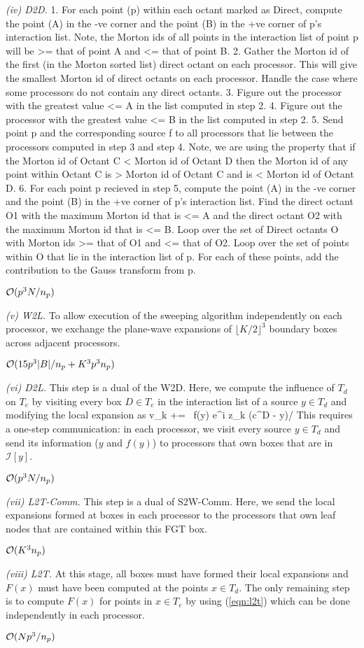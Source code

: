 {\em (iv) D2D.}
1. For each point (p) within each octant marked as Direct, compute the
point (A) in the -ve corner and the point (B) in the +ve corner of p's
interaction list. Note, the Morton ids of all points in the interaction
list of point p will be >= that of point A and <= that of point B.
2. Gather the Morton id of the first (in the Morton sorted list) direct
octant on each processor. This will give the smallest Morton id of
direct octants on each processor. Handle the case where some processors
do not contain any direct octants.
3. Figure out the processor with the greatest value <= A in the list
computed in step 2.
4. Figure out the processor with the greatest value <= B in the list
computed in step 2.
5. Send point p and the corresponding source f to all processors that
lie between the processors computed in step 3 and step 4. Note, we are 
using the property that if the Morton id of Octant C < Morton id of 
Octant D then the Morton id of any point within Octant C is >  Morton
id of Octant C and is < Morton id of Octant D.
6. For each point p recieved in step 5, compute the
point (A) in the -ve corner and the point (B) in the +ve corner of p's
interaction list. Find the direct octant O1 with the maximum Morton id that
is <= A and the direct octant O2 with the maximum Morton id that is <=
B. Loop over the set of Direct octants O with Morton ids >= that of O1
and <= that of O2. Loop over the set of points within O that lie in the
interaction list of p. For each of these points, add the contribution to
the Gauss transform from p.

\hfill $\mathcal{O}(p^3 N/n_p)$

{\em (v) W2L.} To allow execution of the sweeping algorithm independently on each processor, we exchange the plane-wave expansions of $\lfloor K/2 \rfloor ^3$ boundary boxes across adjacent processors. 

\hfill $\mathcal{O}(15 p^3 |B|/n_p + K^3 p^3 n_p)$

{\em (vi) D2L.} This step is a dual of the W2D. Here, we compute the influence of $T_d$ on $T_e$ by visiting every box $D \in T_e$ in the interaction list of a source $y \in T_d$ and modifying the local expansion as 
%
\beq v_k += \, f(y) e^{i z_k \cdot (c^D - y)/\sqrt{\delta}} \eeq
%
This requires a one-step communication: in each processor, we visit every source $y \in T_d$ 
and send its information ($y$ and $f(y)$) to processors that own boxes that are in $\mathcal{I}[y]$.

\hfill $\mathcal{O}(p^3 N / n_p)$

{\em (vii) L2T-Comm.} This step is a dual of S2W-Comm. Here, we send the local expansions formed at boxes in each processor 
to the processors that own leaf nodes that are contained within this FGT box. 

\hfill $\mathcal{O}(K^3 n_p)$

{\em (viii) L2T.} At this stage, all boxes must have formed their local expansions and $F(x)$ must have been computed at the points $x \in T_d$. The only remaining step is to compute $F(x)$ for points in $x \in T_e$ by using (\ref{eqn:l2t}) which can be done independently in each processor. 

\hfill $\mathcal{O}(N p^3/n_p)$

